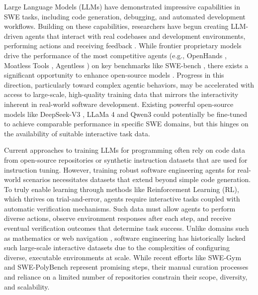 \documentclass[dandb]{article}
\begin{document}
Large Language Models (LLMs) have demonstrated impressive capabilities in SWE tasks, including code generation, debugging, and automated development workflows. Building on these capabilities, researchers have begun creating LLM-driven agents that interact with real codebases and development environments, performing actions and receiving feedback \citep{jin2025llmsllmbasedagentssoftware}. While frontier proprietary models drive the performance of the most competitive agents (e.g., OpenHands \citep{openhands}, Moatless Tools \citep{antoniades2024swesearchenhancingsoftwareagents},
Agentless \citep{xia2024agentlessdemystifyingllmbasedsoftware}) on key benchmarks like SWE-bench \citep{jimenez2024swebench}, there exists a significant opportunity to enhance open-source models \citep{wang2025-introducing-openhands-lm, yang2025swesmithscalingdatasoftware, wang2025swedev, aggarwal2025darsdynamicactionresampling, ma2025thinkinglongerlargerenhancing, wei2025swerladvancingllmreasoning, golubev2024search}. Progress in this direction, particularly toward complex agentic behaviors, may be accelerated with access to large-scale, high-quality training data that mirrors the interactivity inherent in real-world software development. Existing powerful open-source models like DeepSeek-V3 \citep{deepseekai2024deepseekv3technicalreport}, LLaMa 4 \citep{meta2025llama4} and Qwen3 \citep{qwen3} could potentially be fine-tuned to achieve comparable performance in specific SWE domains, but this hinges on the availability of suitable interactive task data.

Current approaches to training LLMs for programming often rely on code data from open-source repositories \citep{lozhkov2024starcoder2stackv2} or synthetic instruction datasets \citep{wei2024selfcodealignselfalignmentcodegeneration} that are used for instruction tuning. However, training robust software engineering agents for real-world scenarios necessitates datasets that extend beyond simple code generation. To truly enable learning through methods like Reinforcement Learning (RL), which thrives on trial-and-error, agents require interactive tasks coupled with automatic verification mechanisms. Such data must allow agents to perform diverse actions, observe environment responses after each step, and receive eventual verification outcomes that determine task success. Unlike domains such as mathematics \citep{shao2024deepseekmathpushinglimitsmathematical} or web navigation \citep{pan2024autonomousevaluationrefinementdigital}, software engineering has historically lacked such large-scale interactive datasets due to the complexities of configuring diverse, executable environments at scale. While recent efforts like SWE-Gym \citep{pan2024trainingsoftwareengineeringagents} and SWE-PolyBench \citep{rashid2025swepolybenchmultilanguagebenchmarkrepository} represent promising steps, their manual curation processes and reliance on a limited number of repositories constrain their scope, diversity, and scalability.
\end{document}
